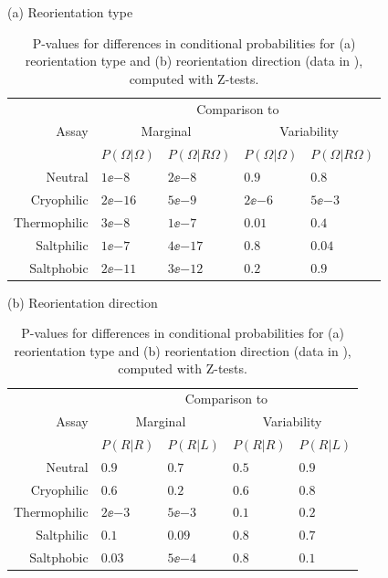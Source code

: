 \documentclass[12pt]{article}
\begin{document}
\begin{table}
  \begin{center}
  (a) Reorientation type\\
  \begin{tabular}{|r|l|l|l|l|}
    \hline
    \multirow{3}{*}{Assay} & \multicolumn{4}{|c|}{Comparison to} \\
    \cline{2-5}
      & \multicolumn{2}{|c|}{Marginal} & \multicolumn{2}{|c|}{Variability} \\
      \cline{2-5}
      & $P(\Omega|\Omega)$ & $P(\Omega|R\Omega)$ & $P(\Omega|\Omega)$ & $P(\Omega|R\Omega)$ \\
    \hline
    Neutral      & $1\ee{-8}$ & $2\ee{-8}$ & $0.9$ & $0.8$ \\
    Cryophilic   & $2\ee{-16}$ & $5\ee{-9}$ & $2\ee{-6}$ & $5\ee{-3}$ \\
    Thermophilic & $3\ee{-8}$ & $1\ee{-7}$ & $0.01$ & $0.4$ \\
    Saltphilic   & $1\ee{-7}$ & $4\ee{-17}$ & $0.8$ & $0.04$ \\
    Saltphobic   & $2\ee{-11}$ & $3\ee{-12}$ & $0.2$ & $0.9$ \\
    \hline
  \end{tabular}

  \vspace{1cm}

  (b) Reorientation direction\\
  \begin{tabular}{|r|l|l|l|l|}
    \hline
    \multirow{3}{*}{Assay} & \multicolumn{4}{|c|}{Comparison to} \\
    \cline{2-5}
      & \multicolumn{2}{|c|}{Marginal} & \multicolumn{2}{|c|}{Variability} \\
      \cline{2-5}
      & $P(R|R)$ & $P(R|L)$ & $P(R|R)$ & $P(R|L)$ \\
    \hline
    Neutral      & $0.9$ & $0.7$ & $0.5$ & $0.9$ \\
    Cryophilic   & $0.6$ & $0.2$ & $0.6$ & $0.8$ \\
    Thermophilic & $2\ee{-3}$ & $5\ee{-3}$ & $0.1$ & $0.2$ \\
    Saltphilic   & $0.1$ & $0.09$ & $0.8$ & $0.7$ \\
    Saltphobic   & $0.03$ & $5\ee{-4}$ & $0.8$ & $0.1$ \\
    \hline
  \end{tabular}
  \end{center}
  \caption[P-values for differences in conditional probabilities.]{P-values for differences in conditional probabilities for (a) reorientation type and (b) reorientation direction (data in ), computed with Z-tests.}\label{tab:condpval}
\end{table}
\end{document}
